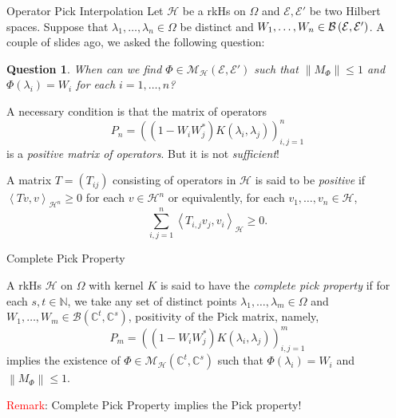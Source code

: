 \documentclass[handout]{beamer}
\newtheorem{question}[theorem]{Question}
\newcommand{\N}{\mathbb N}
\newcommand{\C}{\mathbb C}
\newcommand{\calB}{{\mathcal B}}
\newcommand{\calE}{{\mathcal E}}
\newcommand{\calH}{{\mathcal H}}
\newcommand{\calM}{{\mathcal M}}
\newcommand{\ip}[1]{\left\langle #1 \right\rangle}
\newcommand{\norm}[1]{\left\lVert #1 \right\rVert}
\begin{document}
\begin{frame}{Operator Pick Interpolation}
Let $\calH$ be a rkHs on $\Omega$ and $\calE , \calE'$ be two Hilbert spaces.
\pause
Suppose that $\lambda_{1}, \ldots, \lambda_{n} \in \Omega$ be distinct and $W_{1}, \ldots , W_{n} \in \cal{B} \left( \calE , \calE' \right)$. A couple of slides ago, we asked the following question:
\begin{question}
When can we find $\Phi \in \calM_{\calH} \left( \calE , \calE' \right)$ such that $\norm{M_{\Phi}} \le 1$ and $\Phi \left( \lambda_{i} \right) = W_{i}$ for each $i=1, \ldots , n$?
\end{question}
\pause
A necessary condition is that the matrix of operators
\begin{equation*}
P_{n} = \left( \left( 1-W_{i} W_{j}^{*} \right) K\left( \lambda_{i}, \lambda_{j} \right) \right)_{i,j=1}^{n}
\end{equation*}
is a \textit{positive matrix of operators}. But it is not \textit{sufficient}!

\pause
\begin{definition}
A matrix $T=\left( T_{ij} \right)$ consisting of operators in $\calH$ is said to be \textit{positive} if $\ip{Tv,v}_{\calH ^{n}} \ge 0$ for each $v\in \calH ^{n}$
or equivalently, for each $v_{1}, \ldots , v_{n} \in \calH$,
\begin{equation*}
\sum_{i,j=1}^{n} \ip{T_{i,j} v_{j}, v_{i}}_{\calH} \ge 0.
\end{equation*}
\end{definition}
\end{frame}

\begin{frame}{Complete Pick Property}
\begin{definition}
A rkHs $\calH$ on $\Omega$ with kernel $K$ is said to have the \textit{complete pick property} if for each $s,t \in \N$, we take any set of distinct points $\lambda_{1}, \ldots , \lambda_{m} \in \Omega$ and $W_{1}, \ldots , W_{m} \in \calB \left( \C ^{t}, \C^{s} \right)$, positivity of the Pick matrix, namely,
\begin{equation*}
P_{m} = \left( \left( 1-W_{i} W_{j}^{*} \right) K\left( \lambda_{i}, \lambda_{j} \right) \right)_{i,j=1}^{m}
\end{equation*}
implies the existence of $\Phi \in \calM_{\calH} \left( \C ^{t}, \C ^{s} \right)$ such that $\Phi \left( \lambda_{i} \right) = W_{i}$ and $\norm{M_{\Phi}} \le 1$.
\end{definition}
\pause

\textcolor{red}{Remark}: Complete Pick Property implies the Pick property!

\end{frame}
\end{document}
